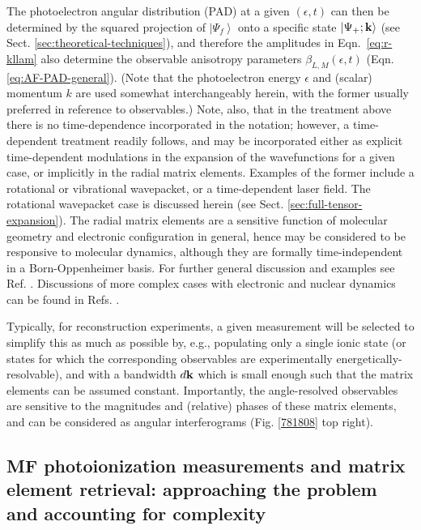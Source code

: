 \documentclass[10pt]{article}
\begin{document}
The photoelectron angular distribution (PAD) at a given $(\epsilon,t)$ can then be determined by the squared projection of $\left|\Psi_f\right>$ onto a specific state $\left|\Psi_{+};\bf{k}\right>$ (see Sect. \ref{sec:theoretical-techniques}), and therefore the amplitudes in Eqn.~\ref{eq:r-kllam} also determine the observable anisotropy parameters $\beta_{L,M}(\epsilon,t)$ (Eqn. \ref{eq:AF-PAD-general}). (Note that the photoelectron energy $\epsilon$ and (scalar) momentum $k$ are used somewhat interchangeably herein, with the former usually preferred in reference to observables.) Note, also, that in the treatment above there is no time-dependence incorporated in the notation; however, a time-dependent treatment readily follows, and may be incorporated either as explicit time-dependent modulations in the expansion of the wavefunctions for a given case, or implicitly in the radial matrix elements. Examples of the former include a rotational or vibrational wavepacket, or a time-dependent laser field. The rotational wavepacket case is discussed herein (see Sect. \ref{sec:full-tensor-expansion}). The radial matrix elements are a sensitive function of molecular geometry and electronic configuration in general, hence may be considered to be responsive to molecular dynamics, although they are formally time-independent in a Born-Oppenheimer basis. For further general discussion and examples see Ref. \cite{wu2011TimeresolvedPhotoelectronSpectroscopy}. Discussions of more complex cases with electronic and nuclear dynamics can be found in Refs.  \cite{arasaki2000ProbingWavepacketDynamics,Seideman2001, Suzuki2001,Stolow2008}.

Typically, for reconstruction experiments, a given measurement will be selected to simplify this as much as possible by, e.g., populating only a single ionic state (or states for which the corresponding observables are experimentally energetically-resolvable), and with a bandwidth $d\bf{k}$ which is small enough such that the matrix elements can be assumed constant. Importantly, the angle-resolved observables are sensitive to the magnitudes and (relative) phases of these matrix elements, and can be considered as angular interferograms (Fig. \ref{781808} top right).


\subsection{MF photoionization measurements and matrix element retrieval: approaching the problem and accounting for complexity\label{sec:MF-recon-basic-intro}}
\end{document}
